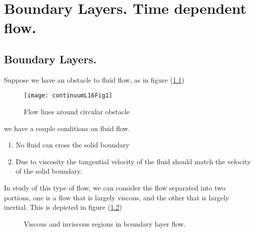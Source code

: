 %
%

\chapter{Boundary Layers.  Time dependent flow.}
\label{chap:continuumL16}
{}
\date{Mar 14, 2012}

\beginArtWithToc

%
%
\section{Boundary Layers.}

Suppose we have an obstacle to fluid flow, as in figure (\ref{fig:continuumL16:continuumL16Fig1})
\begin{figure}[htp]
   \centering
   \texttt{[image: continuumL16Fig1]}
   \caption{Flow lines around circular obstacle}\label{fig:continuumL16:continuumL16Fig1}
\end{figure}

we have a couple conditions on fluid flow.

\begin{enumerate}
\item No fluid can cross the solid boundary
\item Due to viscosity the tangential velocity of the fluid should match the velocity of the solid boundary.
\end{enumerate}

In study of this type of flow, we can consider the flow separated into two portions, one is a flow that is largely viscous, and the other that is largely inertial.  This is depicted in figure (\ref{fig:continuumL16:continuumL16Fig2})
\begin{figure}[htp]
   \centering
   \def\svgwidth{0.5\columnwidth}
%
   \caption{Viscous and inviscous regions in boundary layer flow.}\label{fig:continuumL16:continuumL16Fig2}
\end{figure}

